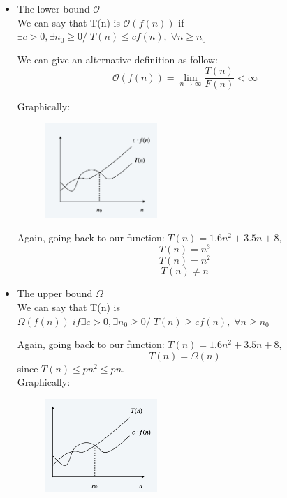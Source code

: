 \documentclass[11pt]{article}
\begin{document}
\begin{itemize}
\item The lower bound $\mathcal{O}$\\
We can say that T(n) is $\mathcal{O}{(f(n))}$ if $\exists c > 0, \exists n_{0} \geq 0 / \; T(n) \leq cf(n), \; \forall n \geq n_{0}$

We can give an alternative definition as follow:
 \[ \mathcal{O}{(f(n))} = \lim_{n\to\infty} \frac{T(n)}{F(n)} < \infty\]
 
Graphically:

\begin{figure}[H]
		\centering
		\includegraphics[width=0.4\textwidth ]{on}
\end{figure}

Again, going back to our function: $T(n) = 1.6n^{2} + 3.5n+8$, 
\[ T(n) = n^{3}\]
\[ T(n) = n^{2}\]
\[ T(n) \neq n\]


\item The upper bound $\Omega$ \\
We can say that T(n) is $ \Omega(f(n)) \;if \exists c > 0, \exists n_{0} \geq 0 / \; T(n) \geq cf(n), \; \forall n \geq n_{0}$

Again, going back to our function: $T(n) = 1.6n^{2} + 3.5n+8$, 
\[ T(n) = \Omega(n)\]
since $T(n) \leq pn^{2} \leq pn$.\\


Graphically:

\begin{figure}[H]
		\centering
		\includegraphics[width=0.4\textwidth ]{omega}
\end{figure}


\end{itemize}
\end{document}
